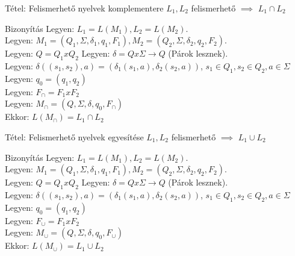 \documentclass{beamer}
\begin{document}
\begin{frame}
\begin{block}{Tétel: Felismerhető nyelvek komplementere}
$L_1, L_2$ felismerhető $\implies$ $L_1 \cap L_2$

\end{block}

\begin{block}{Bizonyítás}
Legyen: $L_1 = L(M_1), L_2 = L(M_2)$.\\
Legyen: $M_1 = (Q_1, \Sigma , {\delta}_1, q_1, F_1), M_2 = (Q_2, \Sigma , {\delta}_2, q_2, F_2)$.\\
Legyen: $Q = Q_1 x Q_2$
Legyen: $\delta = Q x \Sigma \rightarrow Q$ (Párok lesznek).\\
Legyen: $\delta((s_1, s_2), a) = ({\delta}_1(s_1, a), {\delta}_2(s_2, a))$, $s_1 \in Q_1, s_2 \in Q_2, a \in \Sigma$\\
\smallskip
Legyen: $q_0 = (q_1, q_2)$\\
Legyen: \textbf{$F_{\cap} = F_1 x F_2$}\\
\smallskip
Legyen: $M_{\cap} = (Q, \Sigma , \delta , q_0, F_{\cap})$\\
\smallskip
Ekkor: $L(M_{\cap}) = L_1 \cap L_2$\\
\end{block}

\end{frame}

\begin{frame}
\begin{block}{Tétel: Felismerhető nyelvek egyesítése}
$L_1, L_2$ felismerhető $\implies$ $L_1 \cup L_2$

\end{block}

\begin{block}{Bizonyítás}
Legyen: $L_1 = L(M_1), L_2 = L(M_2)$.\\
Legyen: $M_1 = (Q_1, \Sigma , {\delta}_1, q_1, F_1), M_2 = (Q_2, \Sigma , {\delta}_2, q_2, F_2)$.\\
Legyen: $Q = Q_1 x Q_2$
Legyen: $\delta = Q x \Sigma \rightarrow Q$ (Párok lesznek).\\
Legyen: $\delta((s_1, s_2), a) = ({\delta}_1(s_1, a), {\delta}_2(s_2, a))$, $s_1 \in Q_1, s_2 \in Q_2, a \in \Sigma$\\
\smallskip
Legyen: $q_0 = (q_1, q_2)$\\
Legyen: \textbf{$F_{\cup} = F_1 x F_2$}\\
\smallskip
Legyen: $M_{\cup} = (Q, \Sigma , \delta , q_0, F_{\cup})$\\
\smallskip
Ekkor: $L(M_{\cup}) = L_1 \cup L_2$\\
\end{block}

\end{frame}
\end{document}
